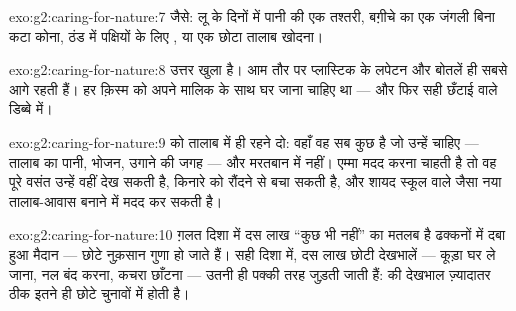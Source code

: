 \begin{solution}{exo:g2:caring-for-nature:7}
जैसे: लू के दिनों में पानी की एक तश्तरी, बग़ीचे का एक जंगली बिना कटा
कोना, ठंड में पक्षियों के लिए , या एक छोटा तालाब खोदना।
\end{solution}

\begin{solution}{exo:g2:caring-for-nature:8}
उत्तर खुला है। आम तौर पर प्लास्टिक के लपेटन और बोतलें ही सबसे आगे
रहती हैं। हर क़िस्म को अपने मालिक के साथ घर जाना चाहिए था --- और फिर
सही छँटाई वाले डिब्बे में।
\end{solution}

\begin{solution}{exo:g2:caring-for-nature:9}
 को तालाब में ही रहने दो: वहाँ वह सब कुछ है जो उन्हें चाहिए
--- तालाब का पानी, भोजन,  उगाने की जगह --- और मरतबान में नहीं।
एम्मा मदद करना चाहती है तो वह पूरे वसंत उन्हें वहीं देख सकती है,
किनारे को रौंदने से बचा सकती है, और शायद स्कूल वाले जैसा नया तालाब-आवास
बनाने में मदद कर सकती है।
\end{solution}

\begin{solution}{exo:g2:caring-for-nature:10}
ग़लत दिशा में दस लाख ``कुछ भी नहीं'' का मतलब है ढक्कनों में दबा हुआ
मैदान --- छोटे नुक़सान गुणा हो जाते हैं। सही दिशा में, दस लाख छोटी
देखभालें --- कूड़ा घर ले जाना, नल बंद करना, कचरा छाँटना --- उतनी ही
पक्की तरह जुड़ती जाती हैं:  की देखभाल ज़्यादातर ठीक इतने ही
छोटे चुनावों में होती है।
\end{solution}
